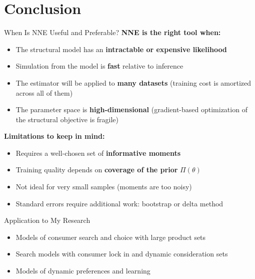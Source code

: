 \documentclass[aspectratio=169,professionalfonts]{beamer}
\newcommand{\hl}[1]{\textbf{\textcolor{UGARed}{#1}}}
\begin{document}
\section{Conclusion}

\begin{frame}{When Is NNE Useful and Preferable?}
  \hl{NNE is the right tool when:}
  \begin{itemize}
    \item The structural model has an \textbf{intractable or expensive likelihood}
    \item Simulation from the model is \textbf{fast} relative to inference
    \item The estimator will be applied to \textbf{many datasets}
          (training cost is amortized across all of them)
    \item The parameter space is \textbf{high-dimensional}
          (gradient-based optimization of the structural objective is fragile)
  \end{itemize}
  \medskip
  \hl{Limitations to keep in mind:}
  \begin{itemize}
    \item Requires a well-chosen set of \textbf{informative moments}
    \item Training quality depends on \textbf{coverage of the prior} $\Pi(\theta)$
    \item Not ideal for very small samples (moments are too noisy)
    \item Standard errors require additional work: bootstrap or delta method
  \end{itemize}
\end{frame}

\begin{frame}{Application to My Research}
  \begin{itemize}
    \item Models of consumer search and choice with large product sets
    \item Search models with consumer lock in and dynamic consideration sets
    \item Models of dynamic preferences and learning
  \end{itemize}
\end{frame}
\end{document}

